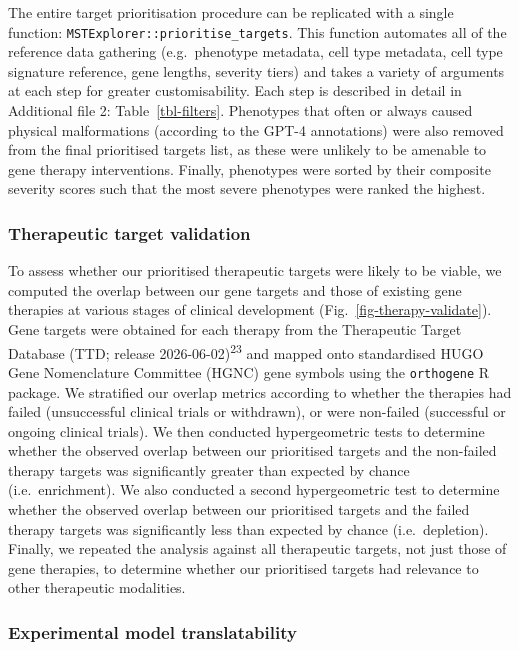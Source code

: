 \documentclass[
]{article}
\begin{document}
The entire target prioritisation procedure can be replicated with a
single function: \texttt{MSTExplorer::prioritise\_targets}. This
function automates all of the reference data gathering (e.g.~phenotype
metadata, cell type metadata, cell type signature reference, gene
lengths, severity tiers) and takes a variety of arguments at each step
for greater customisability. Each step is described in detail in
Additional file 2: Table~\ref{tbl-filters}. Phenotypes that often or
always caused physical malformations (according to the GPT-4
annotations) were also removed from the final prioritised targets list,
as these were unlikely to be amenable to gene therapy interventions.
Finally, phenotypes were sorted by their composite severity scores such
that the most severe phenotypes were ranked the highest.

\subsubsection{Therapeutic target
validation}\label{therapeutic-target-validation}

To assess whether our prioritised therapeutic targets were likely to be
viable, we computed the overlap between our gene targets and those of
existing gene therapies at various stages of clinical development
(Fig.~\ref{fig-therapy-validate}). Gene targets were obtained for each
therapy from the Therapeutic Target Database (TTD; release
2026-06-02)\textsuperscript{23} and mapped onto standardised HUGO Gene
Nomenclature Committee (HGNC) gene symbols using the \texttt{orthogene}
R package. We stratified our overlap metrics according to whether the
therapies had failed (unsuccessful clinical trials or withdrawn), or
were non-failed (successful or ongoing clinical trials). We then
conducted hypergeometric tests to determine whether the observed overlap
between our prioritised targets and the non-failed therapy targets was
significantly greater than expected by chance (i.e.~enrichment). We also
conducted a second hypergeometric test to determine whether the observed
overlap between our prioritised targets and the failed therapy targets
was significantly less than expected by chance (i.e.~depletion).
Finally, we repeated the analysis against all therapeutic targets, not
just those of gene therapies, to determine whether our prioritised
targets had relevance to other therapeutic modalities.

\subsubsection{Experimental model
translatability}\label{experimental-model-translatability}
\end{document}
